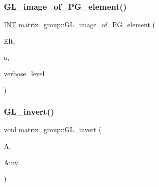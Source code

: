 \mbox{\label{classmatrix__group_a84036031f31b4e9ad9ffeed9af53d7c4}} 
\subsubsection{\texorpdfstring{G\+L\+\_\+image\+\_\+of\+\_\+\+P\+G\+\_\+element()}{GL\_image\_of\_PG\_element()}}
{\footnotesize\ttfamily \mbox{\hyperlink{galois_8h_a09fddde158a3a20bd2dcadb609de11dc}{I\+NT}} matrix\+\_\+group\+::\+G\+L\+\_\+image\+\_\+of\+\_\+\+P\+G\+\_\+element (\begin{DoxyParamCaption}\item[{\mbox{\hyperlink{galois_8h_a09fddde158a3a20bd2dcadb609de11dc}{I\+NT}} $\ast$}]{Elt,  }\item[{\mbox{\hyperlink{galois_8h_a09fddde158a3a20bd2dcadb609de11dc}{I\+NT}}}]{a,  }\item[{\mbox{\hyperlink{galois_8h_a09fddde158a3a20bd2dcadb609de11dc}{I\+NT}}}]{verbose\+\_\+level }\end{DoxyParamCaption})}

\mbox{\label{classmatrix__group_a282d2d580952bf07e63122dbed1774b5}} 
\subsubsection{\texorpdfstring{G\+L\+\_\+invert()}{GL\_invert()}}
{\footnotesize\ttfamily void matrix\+\_\+group\+::\+G\+L\+\_\+invert (\begin{DoxyParamCaption}\item[{\mbox{\hyperlink{galois_8h_a09fddde158a3a20bd2dcadb609de11dc}{I\+NT}} $\ast$}]{A,  }\item[{\mbox{\hyperlink{galois_8h_a09fddde158a3a20bd2dcadb609de11dc}{I\+NT}} $\ast$}]{Ainv }\end{DoxyParamCaption})}

\mbox{\label{classmatrix__group_ab2b9f8046dee535722e07a92ec3ab0b6}} 
